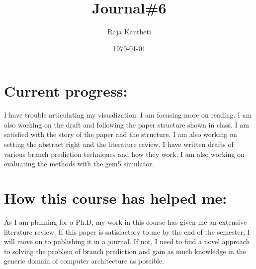 \documentclass[14pt]{extarticle}
\title{Journal\#6}
\author{Raja Kantheti}
\date{\today}
\begin{document}
\maketitle
\section*{Current progress: }
I have trouble articulating my visualization. I am focusing more on reading.
I am also working on the draft and following the paper structure shown
in class. I am satisfied with the story of the paper and the structure. I am also working
on setting the abstract right and the literature review.
I have written drafts of various branch prediction techniques and how they
work. I am also working on evaluating the methods with the gem5 simulator.
\section*{How this course has helped me: }
As I am planning for a Ph.D, my work in this course has given me an extensive literature review.
If this paper is satisfactory to me by the end of the semester, I will
move on to publishing it in a journal. If not, I need to find a novel approach
to solving the problem of branch prediction and gain as much knowledge in the generic
domain of computer architecture as possible.
\end{document}
